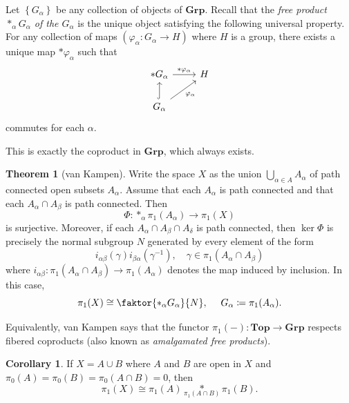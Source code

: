 \documentclass[10pt,letterpaper,cm]{nupset}
\theoremstyle{definition}
\theoremstyle{theorem}
\newtheorem{theorem}[definition]{Theorem}
\newtheorem{corollary}[definition]{Corollary}
\theoremstyle{remark}
\newcommand{\1}{\mathbb{1}}
\newcommand{\0}{\vec 0}
\begin{document}
\bigskip



Let $\left\{G_{\alpha}\right\}$ be any collection of objects of $\mathbf{Grp}$. Recall that the \textit{free product $\ast_{\alpha} G_{\alpha}$ of the $G_{\alpha}$} is the unique object satisfying the following universal property.   For any collection of maps $(\varphi_{\alpha}: G_{\alpha} \to H)$ where $H$ is a group, there exists a unique map $\ast \varphi_{\alpha}$ such that
\[
\begin{tikzcd}
\ast G_{\alpha} \arrow[r, "\ast \varphi_{\alpha}"] & H \\
G_{\alpha} \arrow[ru, "\varphi_{\alpha}"'] \arrow[u, hook] & 
\end{tikzcd}
\] commutes for each $\alpha$.

\smallskip

This is exactly the coproduct in $\mathbf{Grp}$, which always exists.


\begin{theorem}[van Kampen]
Write the space $X$ as the union $\bigcup_{\alpha \in A} A_{\alpha}$ of path connected open subsets $A_{\alpha}$. Assume that each $A_{\alpha}$ is path connected and that each $A_{\alpha} \cap A_{\beta}$ is path connected. Then $$\Phi : \ast_{\alpha} \pi_1(A_{\alpha}) \to \pi_1(X)$$ is surjective. Moreover, if each $A_{\alpha} \cap A_{\beta} \cap A_{\delta}$ is path connected, then $\ker{\Phi}$ is precisely the normal subgroup $N$ generated by every element of the form $$ i_{\alpha \beta} (\gamma ) i_{\beta \alpha}(\gamma^{-1}), \quad \gamma \in \pi_1(A_{\alpha} \cap A_{\beta})$$ where $i_{\alpha \beta} : \pi_1(A_{\alpha} \cap A_{\beta}) \to \pi_1(A_{\alpha})$ denotes the map induced by inclusion.  In this case, $$\pi_1(X) \cong \faktor{\ast_{\alpha} G_{\alpha}}{N}, \ \quad G_{\alpha} \coloneqq  \pi_1(A_{\alpha}).$$
\end{theorem}


Equivalently, van Kampen says that the functor $\pi_1(-) : \mathbf{Top} \to \mathbf{Grp}$ respects fibered coproducts (also known as \textit{amalgamated free products}).

\smallskip

\begin{corollary}
If $X = A \cup B$ where $A$ and $B$ are open in $X$ and $\pi_0(A) = \pi_0(B) = \pi_0(A \cap B) = 0$, then $$\pi_1(X) \cong \pi_1(A) \underset{\pi_1(A\cap B)}{\ast} \pi_1(B).  $$
\end{corollary}
\end{document}
